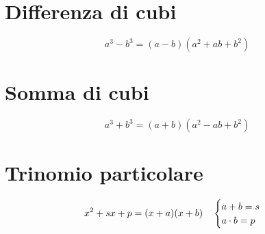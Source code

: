 \section{Differenza di cubi}
\begin{equation}
a^3-b^3=(a-b)(a^2+ab+b^2)
\end{equation}
\section{Somma di cubi}
\begin{equation}
a^3+b^3=(a+b)(a^2-ab+b^2)
\end{equation}
\section{Trinomio particolare}
\begin{equation}
x^2+sx+p=(x+a)(x+b)\quad\begin{cases}
a+b=s\\
a\cdot b=p
\end{cases}\index{Scomposizione!trimomio!particolare}
\end{equation}


